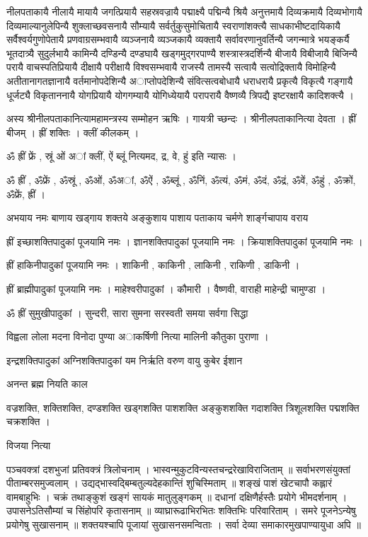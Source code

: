 नीलपताकायै नीलायै मायायै जगत्प्रियायै सहस्रवज्रायै पद्माक्ष्यै पद्मिन्यै श्रियै अनुत्तमायै दिव्यक्रमायै दिव्यभोगायै दिव्यमाल्यानुलेपिन्यै शुक्लाच्छवसनायै सौम्यायै सर्वर्तुकुसुमोचितायै स्वराणांशक्त्यै साधकाभीष्टदायिकायै सर्वैश्वर्यगुणोपेतायै प्रणवाग्रसम्भवायै व्यञ्जनायै व्यञ्जकायै व्यक्तायै सर्वावरणानुवर्तिन्यै जगन्मात्रे भयङ्कर्यै भूतदात्र्यै सुदुर्लभायै कामिन्यै दण्डिन्यै दण्डघायै खड्गमुद्गरपाण्यै शस्त्रास्त्रदर्शिन्यै बीजायै विबीजायै बिजिन्यै परायै वाचस्पतिप्रियायै दीक्षायै परीक्षायै विश्वसम्भवायै राजस्यै तामस्यै सत्वायै सत्वोद्रिक्तायै विमोहिन्यै अतीतानागतज्ञानायै वर्तमानोपदेशिन्यै अाप्तोपदेशिन्यै संवित्सत्वबोधायै धराधरायै प्रकृत्यै विकृत्यै गङ्गायै धूर्जट्यै विकृताननायै योगप्रियायै योगगम्यायै योगिध्येयायै परापरायै वैष्णव्यै त्रिपद्यै इष्टरक्षायै कादिशक्त्यै ।

अस्य श्रीनीलपताकानित्यामहामन्त्रस्य सम्मोहन ऋषिः । गायत्री च्छन्दः । श्रीनीलपताकानित्या देवता । ह्रीं बीजम् । ह्रीं शक्तिः । क्लीं कीलकम् ।

ॐ ह्रीं फ्रें , स्रूं ओं अां क्लीं, ऐं ब्लूं  नित्यमद, द्र, वे, हुं  इति न्यासः ।

ॐ ह्रीं , ॐफ्रें , ॐस्रूं , ॐओं, ॐअां, ॐऐं , ॐब्लूं , ॐनिं, ॐत्यं, ॐमं, ॐदं, ॐद्रं, ॐवें, ॐहुं , ॐक्रों, ॐफ्रें, ह्रीं ।

अभयाय नमः बाणाय खड्गाय शक्तये  अङ्कुशाय पाशाय पताकाय चर्मणे शार्ङ्गचापाय वराय

ह्रीं इच्छाशक्तिपादुकां पूजयामि नमः । ज्ञानशक्तिपादुकां पूजयामि नमः । क्रियाशक्तिपादुकां पूजयामि नमः ।

ह्रीं हाकिनीपादुकां पूजयामि नमः । शाकिनी , काकिनी , लाकिनी , राकिणी , डाकिनी ।

ह्रीं ब्राह्मीपादुकां पूजयामि नमः । माहेश्वरीपादुकां । कौमारी । वैष्णवी, वाराही माहेन्द्री चामुण्डा ।

ॐ ह्रीं सुमुखीपादुकां । सुन्दरी, सारा सुमना सरस्वती समया सर्वगा सिद्धा 

विह्वला लोला मदना विनोदा पुण्या अाकर्षिणी नित्या मालिनी कौतुका  पुराणा ।

इन्द्रशक्तिपादुकां अग्निशक्तिपादुकां यम निर्ऋति वरुण वायु कुबेर ईशान 								

अनन्त ब्रह्म नियति काल 				
																		
वज्रशक्ति, शक्तिशक्ति, दण्डशक्ति खड्गशक्ति पाशशक्ति अङ्कुशशक्ति गदाशक्ति त्रिशूलशक्ति पद्मशक्ति चक्रशक्ति ।



विजया नित्या 

पञ्चवक्त्रां दशभुजां प्रतिवक्त्रं त्रिलोचनाम् ।
भास्वन्मुकुटविन्यस्तचन्द्ररेखाविराजिताम्  ॥
सर्वाभरणसंयुक्तां पीताम्बरसमुज्वलाम् ।
उद्यद्भास्वद्बिम्बतुल्यदेहकान्तिं शुचिस्मिताम् ॥
शङ्खं पाशं खेटचापौ कह्लारं वामबाहुभिः ।
चक्रं तथाङ्कुशं खङ्गं सायकं मातुलुङ्गकम् ॥
दधानां दक्षिणैर्हस्तैः प्रयोगे भीमदर्शनाम् ।
उपासनेऽतिसौम्यां च सिंहोपरि कृतासनाम् ॥
व्याघ्रारूढाभिरभितः शक्तिभिः परिवारिताम् ।
समरे पूजनेऽन्येषु प्रयोगेषु सुखासनाम् ॥
शक्तयश्चापि पूजायां सुखासनसमन्विताः ।
सर्वा देव्या समाकारमुखपाण्यायुधा अपि ॥

